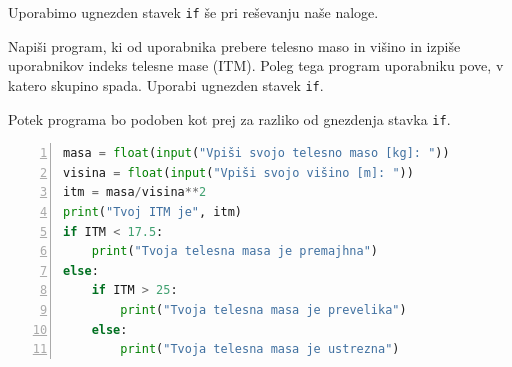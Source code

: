 Uporabimo ugnezden stavek \texttt{if} še pri reševanju naše naloge.
\begin{zgled}
Napiši program, ki od uporabnika prebere telesno maso in višino in izpiše uporabnikov indeks telesne mase (ITM). Poleg tega program uporabniku pove, v katero skupino spada. Uporabi ugnezden stavek \texttt{if}.
\end{zgled}
\begin{resitev}
Potek programa bo podoben kot prej za razliko od gnezdenja stavka \texttt{if}.
\begin{lstlisting}[language=Python,numbers=left]
masa = float(input("Vpiši svojo telesno maso [kg]: "))
visina = float(input("Vpiši svojo višino [m]: "))
itm = masa/visina**2
print("Tvoj ITM je", itm)
if ITM < 17.5:
    print("Tvoja telesna masa je premajhna")
else:
    if ITM > 25:
        print("Tvoja telesna masa je prevelika")
    else:
        print("Tvoja telesna masa je ustrezna")
\end{lstlisting}
\end{resitev}
